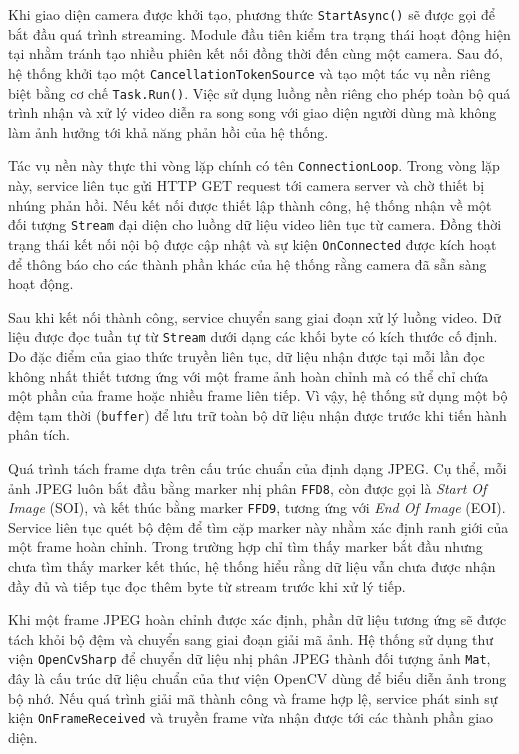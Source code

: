 \documentclass[../DoAn.tex]{subfiles}
\begin{document}
Khi giao diện camera được khởi tạo, phương thức \texttt{StartAsync()} sẽ được gọi để bắt đầu quá trình streaming. Module đầu tiên kiểm tra trạng thái hoạt động hiện tại nhằm tránh tạo nhiều phiên kết nối đồng thời đến cùng một camera. Sau đó, hệ thống khởi tạo một \texttt{CancellationTokenSource} và tạo một tác vụ nền riêng biệt bằng cơ chế \texttt{Task.Run()}. Việc sử dụng luồng nền riêng cho phép toàn bộ quá trình nhận và xử lý video diễn ra song song với giao diện người dùng mà không làm ảnh hưởng tới khả năng phản hồi của hệ thống.

Tác vụ nền này thực thi vòng lặp chính có tên \texttt{ConnectionLoop}. Trong vòng lặp này, service liên tục gửi HTTP GET request tới camera server và chờ thiết bị nhúng phản hồi. Nếu kết nối được thiết lập thành công, hệ thống nhận về một đối tượng \texttt{Stream} đại diện cho luồng dữ liệu video liên tục từ camera. Đồng thời trạng thái kết nối nội bộ được cập nhật và sự kiện \texttt{OnConnected} được kích hoạt để thông báo cho các thành phần khác của hệ thống rằng camera đã sẵn sàng hoạt động.

Sau khi kết nối thành công, service chuyển sang giai đoạn xử lý luồng video. Dữ liệu được đọc tuần tự từ \texttt{Stream} dưới dạng các khối byte có kích thước cố định. Do đặc điểm của giao thức truyền liên tục, dữ liệu nhận được tại mỗi lần đọc không nhất thiết tương ứng với một frame ảnh hoàn chỉnh mà có thể chỉ chứa một phần của frame hoặc nhiều frame liên tiếp. Vì vậy, hệ thống sử dụng một bộ đệm tạm thời (\texttt{buffer}) để lưu trữ toàn bộ dữ liệu nhận được trước khi tiến hành phân tích.

Quá trình tách frame dựa trên cấu trúc chuẩn của định dạng JPEG. Cụ thể, mỗi ảnh JPEG luôn bắt đầu bằng marker nhị phân \texttt{FFD8}, còn được gọi là \textit{Start Of Image} (SOI), và kết thúc bằng marker \texttt{FFD9}, tương ứng với \textit{End Of Image} (EOI). Service liên tục quét bộ đệm để tìm cặp marker này nhằm xác định ranh giới của một frame hoàn chỉnh. Trong trường hợp chỉ tìm thấy marker bắt đầu nhưng chưa tìm thấy marker kết thúc, hệ thống hiểu rằng dữ liệu vẫn chưa được nhận đầy đủ và tiếp tục đọc thêm byte từ stream trước khi xử lý tiếp.

Khi một frame JPEG hoàn chỉnh được xác định, phần dữ liệu tương ứng sẽ được tách khỏi bộ đệm và chuyển sang giai đoạn giải mã ảnh. Hệ thống sử dụng thư viện \texttt{OpenCvSharp} để chuyển dữ liệu nhị phân JPEG thành đối tượng ảnh \texttt{Mat}, đây là cấu trúc dữ liệu chuẩn của thư viện OpenCV dùng để biểu diễn ảnh trong bộ nhớ. Nếu quá trình giải mã thành công và frame hợp lệ, service phát sinh sự kiện \texttt{OnFrameReceived} và truyền frame vừa nhận được tới các thành phần giao diện.
\end{document}
